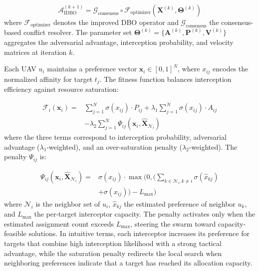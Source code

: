 \documentclass[lettersize,journal]{IEEEtran}
\newcommand{\hladd}[1]{{\color{blue}#1}}
\begin{document}
\begin{equation}
\label{eq:hierarchical}
\mathcal{A}_{\text{IDBO}}^{(k+1)} = \mathcal{G}_{\text{consensus}} \circ \mathcal{F}_{\text{optimizer}} \left( \mathbf{X}^{(k)}, \boldsymbol{\Theta}^{(k)} \right)
\end{equation}
where $\mathcal{F}_{\text{optimizer}}$ denotes the improved DBO operator and $\mathcal{G}_{\text{consensus}}$ the consensus-based conflict resolver. The parameter set $\boldsymbol{\Theta}^{(k)} = \{\mathbf{A}^{(k)}, \mathbf{P}^{(k)}, \mathbf{V}^{(k)}\}$ aggregates the adversarial advantage, interception probability, and velocity matrices at iteration $k$.

Each UAV $u_i$ maintains a preference vector $\mathbf{x}_i \in [0,1]^{N}$, where $x_{ij}$ encodes the normalized affinity for target $t_j$. The fitness function balances interception efficiency against resource saturation:

\begin{equation}
\label{eq:idbo_fitness}
\begin{split}
\mathcal{F}_i(\mathbf{x}_i) =& \sum_{j=1}^{N} \sigma(x_{ij}) \cdot P_{ij} + \lambda_1 \sum_{j=1}^{N} \sigma(x_{ij}) \cdot A_{ij} \\
&- \lambda_2 \sum_{j=1}^{N} \Psi_{ij}(\mathbf{x}_i, \hat{\mathbf{X}}_{\mathcal{N}_i})
\end{split}
\end{equation}
where the three terms correspond to interception probability, adversarial advantage ($\lambda_1$-weighted), and an over-saturation penalty ($\lambda_2$-weighted). The penalty $\Psi_{ij}$ is:

\begin{equation}
\label{eq:saturation_penalty}
\begin{split}
\Psi_{ij}(\mathbf{x}_i, \hat{\mathbf{X}}_{\mathcal{N}_i}) =& \sigma(x_{ij}) \cdot \max\Biggl(0, \Biggl(\sum_{k \in \mathcal{N}_i, k \neq i} \sigma(\hat{x}_{kj}) \\
&+ \sigma(x_{ij})\Biggr) - L_{\max}\Biggr)
\end{split}
\end{equation}
where $\mathcal{N}_i$ is the neighbor set of $u_i$, $\hat{x}_{kj}$ the estimated preference of neighbor $u_k$, and $L_{\max}$ the per-target interceptor capacity. 
The penalty activates only when the estimated assignment count exceeds $L_{\max}$, steering the swarm toward capacity-feasible solutions.
\hladd{In intuitive terms, each interceptor increases its preference
for targets that combine high interception likelihood with a strong
tactical advantage, while the saturation penalty redirects the local search
when neighboring preferences indicate that a target has reached its
allocation capacity.}
\end{document}
